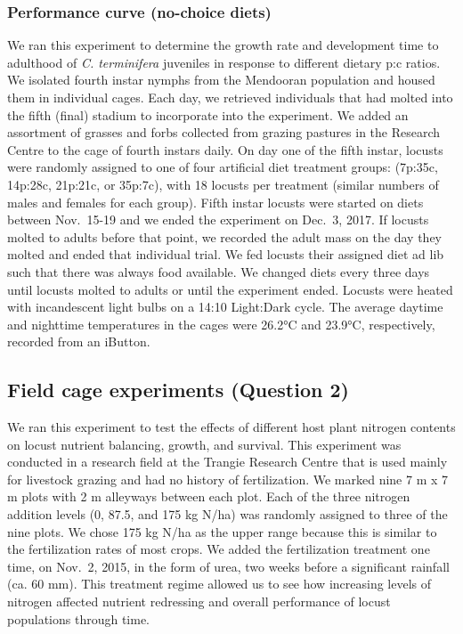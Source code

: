 \documentclass[
]{article}
\begin{document}
\subsubsection{Performance curve (no-choice
diets)}\label{performance-curve-no-choice-diets}

We ran this experiment to determine the growth rate and development time
to adulthood of \emph{C. terminifera} juveniles in response to different
dietary p:c ratios. We isolated fourth instar nymphs from the Mendooran
population and housed them in individual cages. Each day, we retrieved
individuals that had molted into the fifth (final) stadium to
incorporate into the experiment. We added an assortment of grasses and
forbs collected from grazing pastures in the Research Centre to the cage
of fourth instars daily. On day one of the fifth instar, locusts were
randomly assigned to one of four artificial diet treatment groups:
(7p:35c, 14p:28c, 21p:21c, or 35p:7c), with 18 locusts per treatment
(similar numbers of males and females for each group). Fifth instar
locusts were started on diets between Nov.~15-19 and we ended the
experiment on Dec.~3, 2017. If locusts molted to adults before that
point, we recorded the adult mass on the day they molted and ended that
individual trial. We fed locusts their assigned diet ad lib such that
there was always food available. We changed diets every three days until
locusts molted to adults or until the experiment ended. Locusts were
heated with incandescent light bulbs on a 14:10 Light:Dark cycle. The
average daytime and nighttime temperatures in the cages were 26.2°C and
23.9°C, respectively, recorded from an iButton.

\subsection{Field cage experiments (Question
2)}\label{field-cage-experiments-question-2}

We ran this experiment to test the effects of different host plant
nitrogen contents on locust nutrient balancing, growth, and survival.
This experiment was conducted in a research field at the Trangie
Research Centre that is used mainly for livestock grazing and had no
history of fertilization. We marked nine 7 m x 7 m plots with 2 m
alleyways between each plot. Each of the three nitrogen addition levels
(0, 87.5, and 175 kg N/ha) was randomly assigned to three of the nine
plots. We chose 175 kg N/ha as the upper range because this is similar
to the fertilization rates of most crops. We added the fertilization
treatment one time, on Nov.~2, 2015, in the form of urea, two weeks
before a significant rainfall (ca. 60 mm). This treatment regime allowed
us to see how increasing levels of nitrogen affected nutrient redressing
and overall performance of locust populations through time.
\end{document}
